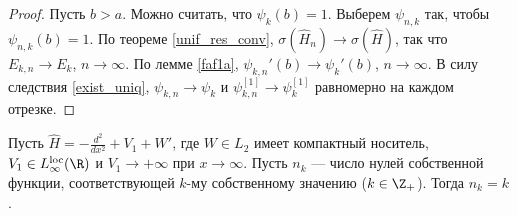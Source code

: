 \documentclass[a4paper
]{article}
\begin{document}
\begin{proof}
Пусть $b>a$.
Можно считать, что $\psi_k(b)=1$. Выберем $\psi_{n,k}$ так, чтобы
$\psi_{n,k}(b)=1$. По теореме \ref{unif_res_conv}, $\sigma(\hat H_n)
\rightarrow \sigma(\hat H)$, так что $E_{k,n}\rightarrow E_k$, $n\rightarrow
\infty$. По лемме \ref{faf1a}, $\psi_{k,n}'(b)\rightarrow \psi_k'(b)$,
$n\rightarrow \infty$. В силу следствия \ref{exist_uniq}, $\psi_{k,n}
\rightarrow \psi_k$ и $\psi^{[1]}_{k,n}\rightarrow \psi^{[1]}_k$ равномерно
на каждом отрезке.
\end{proof}
\begin{Trm}
Пусть $\hat H=-\frac{d^2}{dx^2}+V_1+W'$, где $W\in L_2$ имеет компактный
носитель, $V_1\in L_\infty^{{\rm loc}}(\R)$ и $V_1\rightarrow +\infty$ при
$x\rightarrow \infty$. Пусть $n_k$ --- число нулей собственной функции,
соответствующей $k$-му собственному значению ($k\in \Z_+$). Тогда
$n_k=k$.
\end{Trm}
\end{document}
